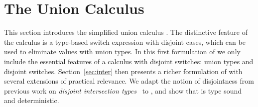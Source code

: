 \begin{comment}
\paragraph{Paper Workflow.}
\baber{New paragraph to outline the workflow of the paper.}
Rest of the paper is organized as follows. \Cref{sec:union} explains
a simple union calculus (\name), an extension of lambda calculus with
union types and the disjoint switch expression. \Cref{sec:inter}
further enriches the \name with intersection types, nominal types,
and distributive subtyping. Note that the calculus in \Cref{sec:union}
is a strict subset of the calculus in \Cref{sec:inter}.
\Cref{sec:discussion} explains the extensions of \name
with parametric polymorphism and with a generalized subtyping rule.
\Cref{sec:related,sec:conclusion} discuss the related work and the future
work respectively.
\end{comment}






\section{The Union Calculus \name}
\label{sec:union}

This section introduces the simplified union calculus \name. The distinctive feature
of the \name calculus is a type-based switch expression with disjoint
cases, which can be used to eliminate values with union types. In this first
formulation of \name we only include the essential features of a calculus with disjoint
switches: union types and disjoint switches. Section~\ref{sec:inter} then presents a richer formulation of \name
with several extensions of practical relevance.
We adapt the notion of disjointness from previous work on
\emph{disjoint intersection types}~\citep{oliveira2016disjoint} to \name, and show that \name is type
sound and deterministic.


